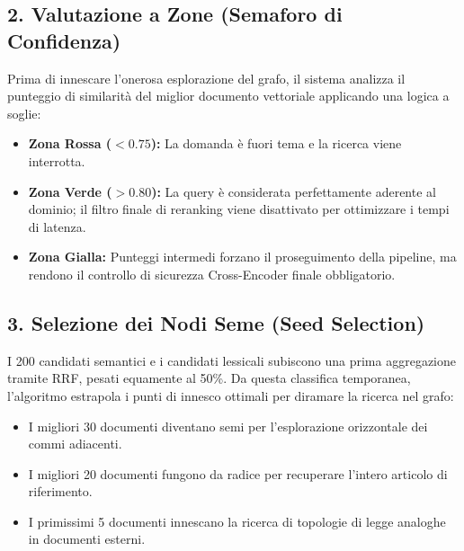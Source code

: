 \subsection{2. Valutazione a Zone (Semaforo di Confidenza)}
Prima di innescare l'onerosa esplorazione del grafo, il sistema analizza il punteggio di similarità del miglior documento vettoriale applicando una logica a soglie:
\begin{itemize}
    \item \textbf{Zona Rossa ($< 0.75$):} La domanda è fuori tema e la ricerca viene interrotta.
    \item \textbf{Zona Verde ($> 0.80$):} La query è considerata perfettamente aderente al dominio; il filtro finale di reranking viene disattivato per ottimizzare i tempi di latenza.
    \item \textbf{Zona Gialla:} Punteggi intermedi forzano il proseguimento della pipeline, ma rendono il controllo di sicurezza Cross-Encoder finale obbligatorio.
\end{itemize}

\subsection{3. Selezione dei Nodi Seme (Seed Selection)}
I 200 candidati semantici e i candidati lessicali subiscono una prima aggregazione tramite RRF, pesati equamente al 50\%. Da questa classifica temporanea, l'algoritmo estrapola i punti di innesco ottimali per diramare la ricerca nel grafo:
\begin{itemize}
    \item I migliori 30 documenti diventano semi per l'esplorazione orizzontale dei commi adiacenti.
    \item I migliori 20 documenti fungono da radice per recuperare l'intero articolo di riferimento.
    \item I primissimi 5 documenti innescano la ricerca di topologie di legge analoghe in documenti esterni.
\end{itemize}

